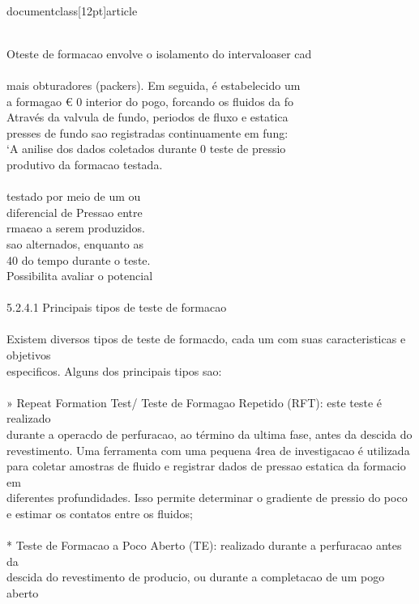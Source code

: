 \\documentclass[12pt]{article}
\begin{document}
\\
Oteste de formacao envolve o isolamento do intervaloaser cad\\
\\
mais obturadores (packers). Em seguida, é estabelecido um\\
a formagao € 0 interior do pogo, forcando os fluidos da fo\\
Através da valvula de fundo, periodos de fluxo e estatica\\
presses de fundo sao registradas continuamente em fung:\\
‘A anilise dos dados coletados durante 0 teste de pressio\\
produtivo da formacao testada.\\
\\
testado por meio de um ou\\
diferencial de Pressao entre\\
rma¢ao a serem produzidos.\\
sao alternados, enquanto as\\
40 do tempo durante o teste.\\
Possibilita avaliar o potencial\\
\\
5.2.4.1 Principais tipos de teste de formacao\\
\\
Existem diversos tipos de teste de formacdo, cada um com suas caracteristicas e objetivos\\
especificos. Alguns dos principais tipos sao:\\
\\
» Repeat Formation Test/ Teste de Formagao Repetido (RFT): este teste é realizado\\
durante a operacdo de perfuracao, ao término da ultima fase, antes da descida do\\
revestimento. Uma ferramenta com uma pequena 4rea de investigacao é utilizada\\
para coletar amostras de fluido e registrar dados de pressao estatica da formacio em\\
diferentes profundidades. Isso permite determinar o gradiente de pressio do poco\\
e estimar os contatos entre os fluidos;\\
\\
* Teste de Formacao a Poco Aberto (TE): realizado durante a perfuracao antes da\\
descida do revestimento de producio, ou durante a completacao de um pogo aberto\\
\end{document}
